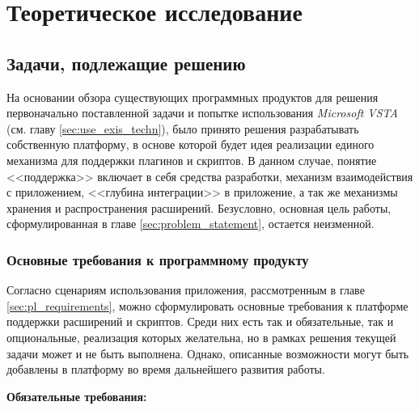 \section{Теоретическое исследование}





\subsection{Задачи, подлежащие решению}

На основании обзора существующих программных продуктов для решения первоначально поставленной задачи и попытке использования {\it Microsoft VSTA}~\cite{vsta-website} (см. главу \ref{sec:use_exis_techn}), было принято решения разрабатывать собственную платформу, в основе которой будет идея реализации единого механизма для поддержки плагинов и скриптов. В данном случае, понятие <<поддержка>> включает в себя средства разработки, механизм взаимодействия с приложением, <<глубина интеграции>> в приложение, а так же механизмы хранения и распространения расширений. Безусловно, основная цель работы, сформулированная в главе \ref{sec:problem_statement}, остается неизменной.

\subsubsection{Основные требования к программному продукту}

Согласно сценариям использования приложения, рассмотренным в главе \ref{sec:pl_requirements}, можно сформулировать основные требования к платформе поддержки расширений и скриптов. Среди них есть так и обязательные, так и опциональные, реализация которых желательна, но в рамках решения текущей задачи может и не быть выполнена. Однако, описанные возможности могут быть добавлены в платформу во время дальнейшего развития работы.

{\bf Обязательные требования:}

